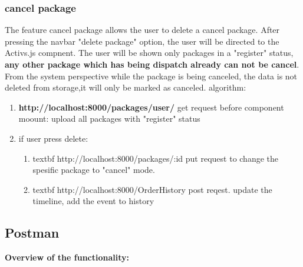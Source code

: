 \subsubsection{cancel package}
The feature cancel package allows the user to delete a cancel package.
After pressing the navbar "delete package" option, the user will be directed to the Activs.js compnent.\newline
The user will be shown only packages in a "register" status, \textbf{any other package which has being dispatch already can not be cancel}.\newline
From the system perspective while the package is being canceled, the data is not deleted from storage,it will only be marked as canceled. algorithm:
\begin{enumerate}
  \item \textbf{http://localhost:8000/packages/user/}  get request before component moount: upload all packages with "register" status
  \item if user press delete:
  \begin{enumerate}
      \item textbf {http://localhost:8000/packages/:id}  put request to change the spesific package to "cancel" mode.
      \item textbf {http://localhost:8000/OrderHistory}  post reqest. update the timeline, add the event to history
\end{enumerate}
\end{enumerate}

\subsection{Postman}
\textbf{Overview of the functionality:}

